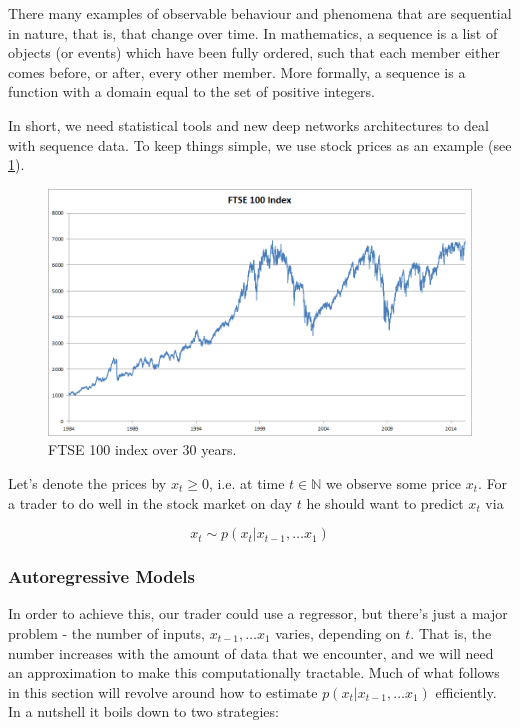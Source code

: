 There many examples of observable behaviour and phenomena that are sequential in nature, that is, that change over time. In mathematics, a sequence is a list of objects (or events) which have been fully ordered, such that each member either comes before, or after, every other member. More formally, a sequence is a function with a domain equal to the set of positive integers.

In short, we need statistical tools and new deep networks architectures to deal with sequence data. To keep things simple, we use stock prices as an example (see \cref{fig:ftse100}).

\begin{figure}[hpt]
	\centering
	\includegraphics[scale=0.5]{images/app/ftse100.png}
	\caption{FTSE 100 index over 30 years.}
	\label{fig:ftse100}
\end{figure}

Let’s denote the prices by $x_t \geq 0$, i.e. at time $t \in \mathbb{N}$ we observe some price $x_t$. For a trader to do well in the stock market on day $t$ he should want to predict $x_t$ via

$$x_t \sim p(x_t|x_{t-1}, \ldots x_1)$$

\subsubsection{Autoregressive Models}

In order to achieve this, our trader could use a regressor, but there’s just a major problem - the number of inputs, $x_{t-1}, \ldots x_1$ varies, depending on $t$. That is, the number increases with the amount of data that we encounter, and we will need an approximation to make this computationally tractable. Much of what follows in this section will revolve around how to estimate $p(x_t|x_{t-1}, \ldots x_1)$ efficiently. In a nutshell it boils down to two strategies:

